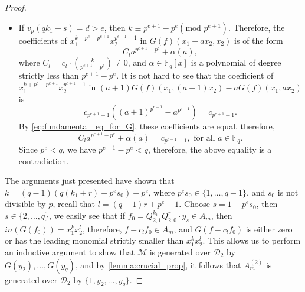\documentclass[12pt,a4paper]{report}
\theoremstyle{definition}
\theoremstyle{remark}
\theoremstyle{definition}
\begin{document}
\begin{proof}
\begin{itemize}
where $C_l = c_l \cdot \binom{k}{p^d}\neq 0$, and $\alpha\in \mathbb{F}_q[x]$ is a polynomial of degree strictly less than $p^d$. It is not hard to see that the coefficient of $x_1^{k-p^d}x_2^{l+p^d}$ in $(a+1)G(f)(x_1, (a+1)x_2)-aG(f)(x_1, ax_2)$ is
\begin{equation*}
    c_{p^d+l}((a+1)^{p^d + p^e+1}-a^{p^d+p^e+1}) = c_{p^d + l}(a^{p^d} + a^{p^e}+1).
\end{equation*}
By \eqref{eq:fundamental_eq_for_G}, these coefficients are equal, therefore,
\begin{equation*}
    C_l a^{p^d} + \alpha(a) = c_{p^d + l}(a^{p^d} + a^{p^e}+1), \text{ for all } a\in \mathbb{F}_q.
\end{equation*}
As $p^d < p^e<q$, and $\deg(\alpha)<p^d$, it follows that $c_{p^d+l} = 0$, and hence $C_l = 0$, a contradiction.
\item If $v_p(qk_1+s)= d>e$, then $k \equiv p^{e+1} - p^{e}(\text{mod }p^{e+1})$. Therefore, the coefficients of $x_1^{k+p^e - p^{e+1}}x_2^{p^{e+1}-1}$ in $G(f)(x_1+ax_2, x_2)$ is of the form 
\begin{equation*}
    C_l a^{p^{e+1}-p^e} + \alpha(a),
\end{equation*}
where $C_l = c_l \cdot \binom{k}{p^{e+1}-p^e}\neq 0$, and $\alpha\in \mathbb{F}_q[x]$ is a polynomial of degree strictly less than $p^{e+1}-p^e$. It is not hard to see that the coefficient of $x_1^{k+p^e - p^{e+1}}x_2^{p^{e+1}-1}$ in $(a+1)G(f)(x_1, (a+1)x_2)-aG(f)(x_1, ax_2)$ is
\begin{equation*}
    c_{p^{e+1}-1}((a+1)^{p^{e+1}}-a^{p^{e+1}}) = c_{p^{e+1}-1}.
\end{equation*}
By \eqref{eq:fundamental_eq_for_G}, these coefficients are equal, therefore,
\begin{equation*}
    C_l a^{p^{e+1}-p^e} + \alpha(a) = c_{p^{e+1}-1}, \text{ for all } a\in \mathbb{F}_q.
\end{equation*}
Since $p^{e}<q$, we have $p^{e+1}-p^e < q$, therefore, the above equality is a contradiction. 
\end{itemize}
The arguments just presented have shown that $k = (q-1)(q(k_1+r) + p^e s_0) - p^e$, where $p^e s_0 \in \{1, \ldots, q-1\}$, and $s_0$ is not divisible by $p$, recall that $l = (q-1)r + p^e-1$. Choose $s = 1 + p^e s_0$, then $s\in \{2, \ldots, q\}$, we easily see that if $f_0 = Q_{2, 1}^{k_1} Q_{2, 0}^r\cdot y_s \in A_m$, then $in(G(f_0)) = x_1^{k}x_2^{l}$, therefore, $f-c_l f_0\in A_m$, and $G(f-c_l f_0)$ is either zero or has the leading monomial strictly smaller than $x_1^k x_2^l$. This allows us to perform an inductive argument to show that $\mathcal{M}$ is generated over $\mathcal{D}_2$ by $G(y_2), \ldots, G(y_q)$, and by \cref{lemma:crucial_prop}, it follows that $A_m^{(2)}$ is generated over $\mathcal{D}_2$ by $\{1, y_2, \ldots, y_q\}$.\smallbreak

\end{proof}
\end{document}
